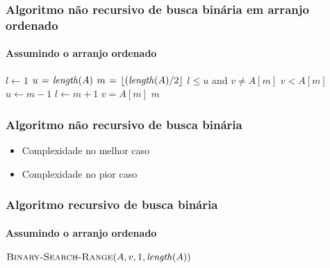 \documentclass{beamer}
\begin{document}
\begin{frame}
  \frametitle{Algoritmo não recursivo de busca binária em arranjo ordenado}
  \framesubtitle{Assumindo o arranjo ordenado}

\begin{small}
\begin{codebox}
\zi \Comment {}
\li $l \gets 1$
\li $u \gets \id{length}(A)$
\li $m \gets \lfloor (\id{length}(A)/2 \rfloor$
\li \While $l \le u$ and $v \neq A[m]$
\li \Do
\li    \If $v < A[m]$
\li    \Then
         $u \gets m-1$
\li    \Else
         $l \gets m+1$
       \End
{} 
    \End
\li \If $v = A[m]$
\li \Then
      \Return $m$
\li \Else
      \Return {}
    \End
\zi \Comment {}
\end{codebox}  
\end{small}
\end{frame}

\begin{frame}
  \frametitle{Algoritmo não recursivo de busca binária}

\begin{itemize}

  \item Complexidade no melhor caso

  \item Complexidade no pior caso

\end{itemize}

\end{frame}

\begin{frame}
  \frametitle{Algoritmo recursivo de busca binária}
  \framesubtitle{Assumindo o arranjo ordenado}

\begin{codebox}
\zi \Comment {}
\li \Return $\proc{Binary-Search-Range}(A, v, 1, \id{length}(A))$
\zi \Comment {}
\end{codebox}  

\end{frame}
\end{document}
